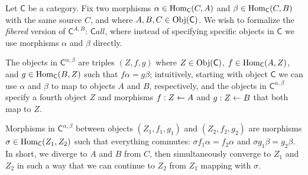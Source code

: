 \begin{solution}
	\def \C {\mathsf{C}}
	\def \Cobj {\C^{A,B}}
	
	Let $\mathsf{C}$ be a category. Fix two morphisms $\alpha\in\mathrm{Hom}_\mathsf{C}(C,A)$ and
	$\beta\in\mathrm{Hom}_\mathsf{C}(C,B)$ with the same source $C$, and where $A,B,C\in\mathrm{Obj}(\mathsf{C})$.
	We wish to formalize the \textit{fibered} version of $\mathsf{C}^{A,B}$: $\mathsf{C}all$, where
	instead of specifying specific objects in $\mathsf{C}$ we use morphisms $\alpha$ and
	$\beta$ directly.
	
	The objects in $\mathsf{C}^{\alpha,\beta}$ are triples $(Z,f,g)$ where $Z\in\mathrm{Obj}(\mathsf{C})$,
	$f\in\mathrm{Hom}_{\mathsf{C}}(A,Z)$, and $g\in\mathrm{Hom}_{\mathsf{C}}(B,Z)$ such that $f\alpha = g\beta$;
	intuitively, starting with object $\mathsf{C}$ we can use $\alpha$ and $\beta$ to map to
	objects $A$ and $B$, respectively, and the objects in $\mathsf{C}^{\alpha,\beta}$ specify a fourth
	object $Z$ and morphisms $f:Z\leftarrow A$ and $g:Z\leftarrow B$ that both map to $Z$.
	
	Morphisms in $\mathsf{C}^{\alpha,\beta}$ between objects $(Z_1,f_1,g_1)$ and $(Z_2,f_2,g_2)$ are
	morphisms $\sigma\in\mathrm{Hom}_\mathsf{C}(Z_1,Z_2)$ such that everything commutes: $\sigma f_1
	\alpha = f_2 \alpha$ and $\sigma g_1 \beta = g_2 \beta$. In short, we diverge to
	$A$ and $B$ from $C$, then simultaneously converge to $Z_1$ and $Z_2$ in such a
	way that we can continue to $Z_2$ from $Z_1$ mapping with $\sigma$.
	
\end{solution}

